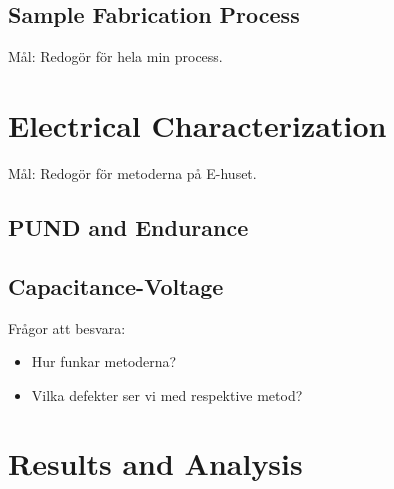 \documentclass[11pt,twoside]{eitExjobb}
\begin{document}
\section{Sample Fabrication Process}\label{sec:FabProc}

Mål: Redogör för hela min process.

\chapter{Electrical Characterization}\label{ch:char}

Mål: Redogör för metoderna på E-huset.

\section{PUND and Endurance}\label{sec:PandE}

\section{Capacitance-Voltage}

Frågor att besvara: 
\begin{itemize}
    \item Hur funkar metoderna? 
    \item Vilka defekter ser vi med respektive metod? 
\end{itemize}

\chapter{Results and Analysis}\label{ch:res}
\end{document}

